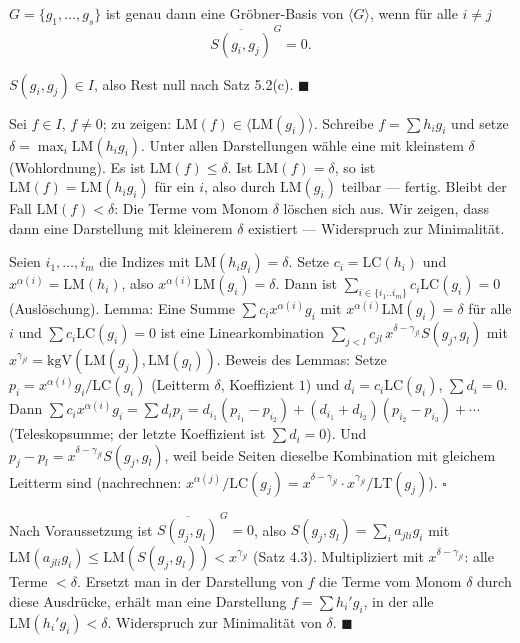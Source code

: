 \begin{merksatz}
$G = \{g_1, \ldots, g_s\}$ ist genau dann eine Gröbner-Basis von $\langle G\rangle$, wenn für alle $i\ne j$
\[ \overline{S(g_i, g_j)}^{\,G} = 0 . \]

$S(g_i, g_j)\in I$, also Rest null nach Satz 5.2(c). $\blacksquare$

Sei $f\in I$, $f\ne0$; zu zeigen: $\mathrm{LM}(f)\in\langle\mathrm{LM}(g_i)\rangle$. Schreibe $f = \sum h_ig_i$ und setze $\delta = \max_i\mathrm{LM}(h_ig_i)$. Unter allen Darstellungen wähle eine mit kleinstem $\delta$ (Wohlordnung). Es ist $\mathrm{LM}(f)\le\delta$. Ist $\mathrm{LM}(f) = \delta$, so ist $\mathrm{LM}(f) = \mathrm{LM}(h_ig_i)$ für ein $i$, also durch $\mathrm{LM}(g_i)$ teilbar --- fertig. Bleibt der Fall $\mathrm{LM}(f) < \delta$: Die Terme vom Monom $\delta$ löschen sich aus. Wir zeigen, dass dann eine Darstellung mit kleinerem $\delta$ existiert --- Widerspruch zur Minimalität.

Seien $i_1, \ldots, i_m$ die Indizes mit $\mathrm{LM}(h_ig_i) = \delta$. Setze $c_i = \mathrm{LC}(h_i)$ und $x^{\alpha(i)} = \mathrm{LM}(h_i)$, also $x^{\alpha(i)}\mathrm{LM}(g_i) = \delta$. Dann ist $\sum_{i\in\{i_1..i_m\}}c_i\mathrm{LC}(g_i) = 0$ (Auslöschung). Lemma: Eine Summe $\sum c_ix^{\alpha(i)}g_i$ mit $x^{\alpha(i)}\mathrm{LM}(g_i) = \delta$ für alle $i$ und $\sum c_i\mathrm{LC}(g_i) = 0$ ist eine Linearkombination $\sum_{j<l}c_{jl}\,x^{\delta - \gamma_{jl}}S(g_j, g_l)$ mit $x^{\gamma_{jl}} = \mathrm{kgV}(\mathrm{LM}(g_j), \mathrm{LM}(g_l))$. Beweis des Lemmas: Setze $p_i = x^{\alpha(i)}g_i/\mathrm{LC}(g_i)$ (Leitterm $\delta$, Koeffizient $1$) und $d_i = c_i\mathrm{LC}(g_i)$, $\sum d_i = 0$. Dann $\sum c_ix^{\alpha(i)}g_i = \sum d_ip_i = d_{i_1}(p_{i_1} - p_{i_2}) + (d_{i_1} + d_{i_2})(p_{i_2} - p_{i_3}) + \cdots$ (Teleskopsumme; der letzte Koeffizient ist $\sum d_i = 0$). Und $p_j - p_l = x^{\delta - \gamma_{jl}}S(g_j, g_l)$, weil beide Seiten dieselbe Kombination mit gleichem Leitterm sind (nachrechnen: $x^{\alpha(j)}/\mathrm{LC}(g_j) = x^{\delta - \gamma_{jl}}\cdot x^{\gamma_{jl}}/\mathrm{LT}(g_j)$). $\square$

Nach Voraussetzung ist $\overline{S(g_j, g_l)}^{\,G} = 0$, also $S(g_j, g_l) = \sum_i a_{jli}g_i$ mit $\mathrm{LM}(a_{jli}g_i)\le\mathrm{LM}(S(g_j, g_l)) < x^{\gamma_{jl}}$ (Satz 4.3). Multipliziert mit $x^{\delta - \gamma_{jl}}$: alle Terme $< \delta$. Ersetzt man in der Darstellung von $f$ die Terme vom Monom $\delta$ durch diese Ausdrücke, erhält man eine Darstellung $f = \sum h_i'g_i$, in der alle $\mathrm{LM}(h_i'g_i) < \delta$. Widerspruch zur Minimalität von $\delta$. $\blacksquare$


\end{merksatz}
